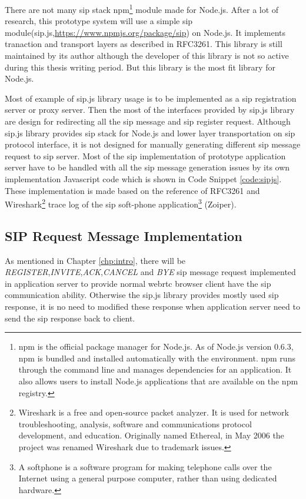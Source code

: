 \noindent There are not many \gls{sip} stack \gls{npm}\footnote{npm is the official package manager for Node.js. As of Node.js version 0.6.3, npm is bundled and installed automatically with the environment. npm runs through the command line and manages dependencies for an application. It also allows users to install Node.js applications that are available on the npm registry.\cite{wiki:npm}} module made for Node.js. After a lot of research, this prototype system will use a simple \gls{sip} module(sip.js,\url{https://www.npmjs.org/package/sip}) on Node.js. It implements tranaction and transport layers as described in RFC3261. This library is still maintained by its author although the developer of this library is not so active during this thesis writing period. But this library is the most fit library for Node.js.

\par Most of example of sip.js library usage is to be implemented as a \gls{sip} registration server or proxy server. Then the most of the interfaces provided by sip.js library are design for redirecting all the \gls{sip} message and \gls{sip} register request. Although sip.js library provides \gls{sip} stack for Node.js and lower layer transportation on \gls{sip} protocol interface, it is not designed for manually generating different \gls{sip} message request to \gls{sip} server. Most of the \gls{sip} implementation of prototype application server have to be handled with all the \gls{sip} message generation issues by its own implementation Javascript code which is shown in Code Snippet \ref{code:sipjs}. These implementation is made based on the reference of RFC3261 and Wireshark\footnote{Wireshark is a free and open-source packet analyzer. It is used for network troubleshooting, analysis, software and communications protocol development, and education. Originally named Ethereal, in May 2006 the project was renamed Wireshark due to trademark issues.\cite{wiki:wireshark}} trace log of the \gls{sip} soft-phone application\footnote{A softphone is a software program for making telephone calls over the Internet using a general purpose computer, rather than using dedicated hardware.\cite{wiki:softphone}} (Zoiper).

\subsection{SIP Request Message Implementation}

\par As mentioned in Chapter \ref{chp:intro}, there will be \textit{REGISTER},\textit{INVITE},\textit{ACK},\textit{CANCEL} and \textit{BYE} \gls{sip} message request implemented in application server to provide normal \gls{webrtc} browser client have the \gls{sip} communication ability. Otherwise the sip.js library provides mostly used \gls{sip} response, it is no need to modified these response when application server need to send the \gls{sip} response back to client.

